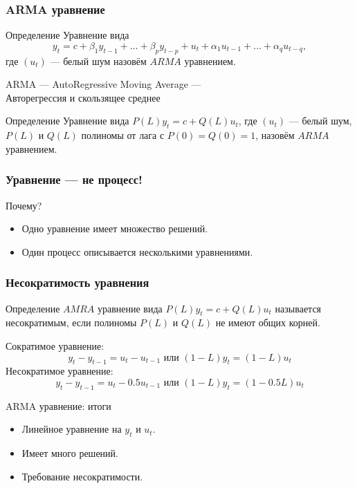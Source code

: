 \begin{frame}
  \frametitle{ARMA уравнение}

  \begin{block}{Определение}
    Уравнение вида
    \[
      y_t = c + \beta_1 y_{t-1} + \ldots + \beta_p y_{t-p} + u_t + \alpha_1 u_{t-1} + \ldots + \alpha_q u_{t-q},
    \]
    где $(u_t)$ — белый шум назовём $ARMA$ уравнением. 
    
    \alert{ARMA — AutoRegressive Moving Average — \\
    Авторегрессия и скользящее среднее}
  \end{block}
  

  \pause
  \begin{block}{Определение}
    Уравнение вида $P(L) y_t = c + Q(L) u_t$, 
    где $(u_t)$ — белый шум, $P(L)$ и $Q(L)$ полиномы от лага с $P(0)=Q(0)=1$, назовём $ARMA$ уравнением.   
  \end{block}

\end{frame}

\begin{frame}
  \frametitle{Уравнение — не процесс!}

  Почему?
  \begin{itemize}[<+->]
    \item Одно уравнение имеет \alert{множество решений}.
    \item Один процесс описывается \alert{несколькими уравнениями}. 
  \end{itemize}  

\end{frame}


\begin{frame}
  \frametitle{Несократимость уравнения}

  \begin{block}{Определение}
    $AMRA$ уравнение вида $P(L) y_t = c + Q(L) u_t$ называется \alert{несократимым}, 
    если полиномы $P(L)$ и $Q(L)$ не имеют общих корней. 
  \end{block}

  \pause 
  Сократимое уравнение:
  \[
   y_t - y_{t-1} = u_t - u_{t-1}     \text{ или } (1- L)y_t = (1 - L)u_t
  \]
  \pause
  Несократимое уравнение:
  \[
   y_t - y_{t-1} = u_t - 0.5u_{t-1}     \text{ или } (1- L)y_t = (1 - 0.5L)u_t
  \]

\end{frame}




\begin{frame}{ARMA уравнение: итоги}

  \begin{itemize}[<+->]
    \item Линейное уравнение на $y_t$ и $u_t$.
    \item Имеет много решений. 
    \item Требование несократимости. 
  \end{itemize}
\end{frame}

